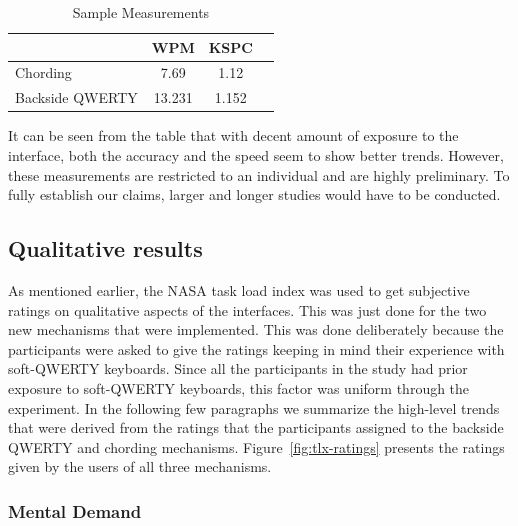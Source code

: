 \begin{table}
	\centering
		\begin{tabular}{|l|c|c|c|} \hline
		                         & WPM & KSPC \\ \hline
			 Chording & 7.69 & 1.12 \\ \hline
			 Backside QWERTY & 13.231 & 1.152 \\ \hline
		\end{tabular}
	\caption{Sample Measurements}
	\label{tab:StatisticsForTestCorpora}
\end{table}

It can be seen from the table that with decent amount of exposure to
the interface, both the accuracy and the speed seem to show better
trends. However, these measurements are restricted to an individual
and are highly preliminary. To fully establish our claims, larger and
longer studies would have to be conducted.

\subsection{Qualitative results}

As mentioned earlier, the NASA task load index was used to get
subjective ratings on qualitative aspects of the interfaces. This was
just done for the two new mechanisms that were implemented. This was
done deliberately because the participants were asked to give the
ratings keeping in mind their experience with soft-QWERTY
keyboards. Since all the participants in the study had prior exposure
to soft-QWERTY keyboards, this factor was uniform through the
experiment. In the following few paragraphs we summarize the
high-level trends that were derived from the ratings that the
participants assigned to the backside QWERTY and chording
mechanisms. Figure~\ref{fig:tlx-ratings} presents the ratings given by
the users of all three mechanisms.

\subsubsection{Mental Demand}

